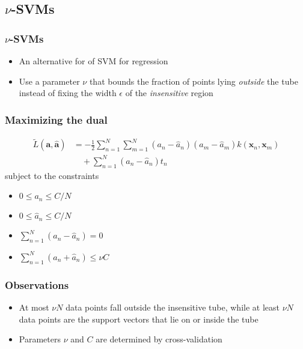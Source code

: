 \documentclass[t,14pt]{beamer}
\begin{document}
\subsection{$\nu$-SVMs}

\begin{frame}
  \frametitle{$\nu$-SVMs}
  \begin{itemize}
    \item {An alternative for of SVM for regression}
    \item {
            Use a parameter $\nu$ that bounds the fraction of points lying 
            \textit{outside} the tube instead of fixing the width $\epsilon$ 
            of the \textit{insensitive} region
          }
  \end{itemize}
\end{frame}

\begin{frame}
  \frametitle{Maximizing the dual}
  \vspace{-2em}
  \begin{align} 
    \widetilde{L}(\mathbf{a}, \widehat{\mathbf{a}}) &= 
        -\frac{\displaystyle 1}{\displaystyle 2}
        \sum\limits_{n=1}^N \sum\limits_{m=1}^N 
            (a_n - \widehat{a}_n)(a_m - \widehat{a}_m)
            k(\mathbf{x}_n,\mathbf{x}_m) \nonumber \\
            &\quad + \sum\limits_{n=1}^N(a_n - \widehat{a}_n)t_n
  \end{align}
  subject to the constraints
  \begin{multicols}{2}
  \begin{itemize}
    \item {$0 \leq a_n \leq C/N$}
    \item {$0 \leq \widehat{a}_n \leq C/N$}
    \item {$\sum\limits_{n=1}^N(a_n - \widehat{a}_n) = 0$} 
    \vfill
    \columnbreak
    \item {$\sum\limits_{n=1}^N(a_n + \widehat{a}_n) \leq \nu C$} 
  \end{itemize}
  \end{multicols}
\end{frame}

\begin{frame}
  \frametitle{Observations}
  \begin{itemize}
    \item{  
            At most $\nu N$ data points fall outside the insensitive tube, while 
            at least $\nu N$ data points are the support vectors that lie on or 
            inside the tube
         }
    \item {Parameters $\nu$ and $C$ are determined by cross-validation}
  \end{itemize}
\end{frame}
\end{document}

